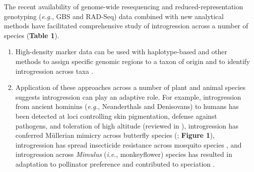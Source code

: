 \documentclass[11pt]{article}
\newcommand{\lwang}[1]{\textcolor{red}{ \emph{\scriptsize  #1}} } %
\begin{document}
The recent availability of genome-wide resequencing and reduced-representation genotyping (\emph{e.g.}, GBS and RAD-Seq) data combined with new analytical methods have facilitated comprehensive study of introgression across a number of species (\textbf{Table 1}).
\begin{enumerate}
\item{High-density marker data can be used with haplotype-based and other methods to assign specific genomic regions to a taxon of origin and to identify introgression across taxa \cite{Martin2015,Price2009,Lawson2012,pease2015,rosenzweig2016,geneva2015}.}
\item{Application of these approaches across a number of plant and animal species suggests introgression can play an adaptive role. For example, introgression from ancient hominins (\emph{e.g.}, Neanderthals and Denisovans) to humans has been detected at loci controlling skin pigmentation, defense against pathogens, and toleration of high altitude (reviewed in \cite{Racimo2015}), introgression has conferred M\"{u}llerian mimicry across butterfly species (\cite{Heliconius2012}; \textbf{Figure 1}), introgression has spread insecticide resistance across mosquito species \cite{Norris2015}, and introgression across \emph{Mimulus} (\emph{i.e.}, monkeyflower) species has resulted in adaptation to pollinator preference and contributed to speciation \cite{Stankowski2015}}.
\end{enumerate}



\end{document}
